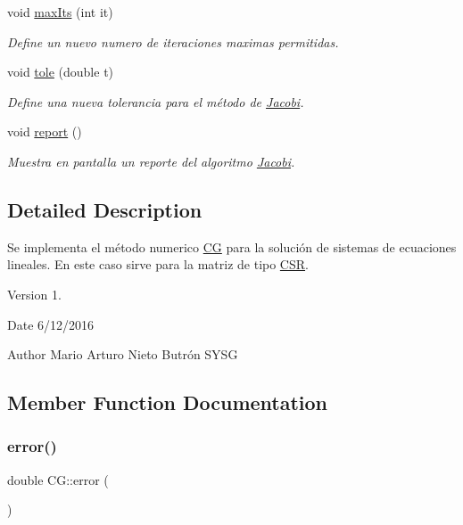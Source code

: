\begin{DoxyCompactItemize}
void \hyperlink{class_c_g_aac19c7231dd7771921bbee15ab675b18}{max\+Its} (int it)
\begin{DoxyCompactList}\small\item\em Define un nuevo numero de iteraciones maximas permitidas. \end{DoxyCompactList}\item 
void \hyperlink{class_c_g_a2153a35147089adbfb44eb1ec99ae982}{tole} (double t)
\begin{DoxyCompactList}\small\item\em Define una nueva tolerancia para el método de \hyperlink{class_jacobi}{Jacobi}. \end{DoxyCompactList}\item 
void \hyperlink{class_c_g_a48c691b4dc72ceb0afcc21e6d0e85140}{report} ()
\begin{DoxyCompactList}\small\item\em Muestra en pantalla un reporte del algoritmo \hyperlink{class_jacobi}{Jacobi}. \end{DoxyCompactList}\end{DoxyCompactItemize}


\subsection{Detailed Description}
Se implementa el método numerico \hyperlink{class_c_g}{CG} para la solución de sistemas de ecuaciones lineales. En este caso sirve para la matriz de tipo \hyperlink{class_c_s_r}{C\+SR}. 

\begin{DoxyVersion}{Version}
1. 
\end{DoxyVersion}
\begin{DoxyDate}{Date}
6/12/2016 
\end{DoxyDate}
\begin{DoxyAuthor}{Author}
Mario Arturo Nieto Butrón  S\+Y\+SG 
\end{DoxyAuthor}


\subsection{Member Function Documentation}
\hypertarget{class_c_g_a7fc212af782350d9a9a9fac5c6be62de}{}\label{class_c_g_a7fc212af782350d9a9a9fac5c6be62de} 
\subsubsection{\texorpdfstring{error()}{error()}}
{\footnotesize\ttfamily double C\+G\+::error (\begin{DoxyParamCaption}{ }\end{DoxyParamCaption})\hspace{0.3cm}{\ttfamily [inline]}}



